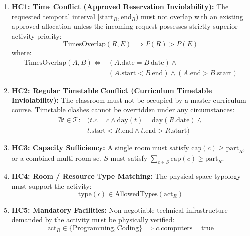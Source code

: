 \documentclass[conference]{IEEEtran}
\begin{document}
\begin{enumerate}
    \item \textbf{HC1: Time Conflict (Approved Reservation Inviolability):} The requested temporal interval $[\text{start}_R, \text{end}_R)$ must not overlap with an existing approved allocation unless the incoming request possesses strictly superior activity priority:
    \begin{equation}
    \text{TimesOverlap}(R, E) \implies P(R) > P(E)
    \end{equation}
    where:
    \begin{equation}
    \begin{aligned}
    \text{TimesOverlap}(A, B) \iff & (A.\text{date} = B.\text{date}) \land \\
    & (A.\text{start} < B.\text{end}) \land (A.\text{end} > B.\text{start})
    \end{aligned}
    \end{equation}
    \item \textbf{HC2: Regular Timetable Conflict (Curriculum Timetable Inviolability):} The classroom must not be occupied by a master curriculum course. Timetable clashes cannot be overridden under any circumstances:
    \begin{equation}
    \begin{aligned}
    \nexists t \in \mathcal{T} : & (t.c = c \land \text{day}(t) = \text{day}(R.\text{date}) \land \\
    & t.\text{start} < R.\text{end} \land t.\text{end} > R.\text{start})
    \end{aligned}
    \end{equation}
    \item \textbf{HC3: Capacity Sufficiency:} A single room must satisfy $\text{cap}(c) \ge \text{part}_R$, or a combined multi-room set $S$ must satisfy $\sum_{c \in S} \text{cap}(c) \ge \text{part}_R$.
    \item \textbf{HC4: Room / Resource Type Matching:} The physical space typology must support the activity:
    \begin{equation}
    \text{type}(c) \in \text{AllowedTypes}(\text{act}_R)
    \end{equation}
    \item \textbf{HC5: Mandatory Facilities:} Non-negotiable technical infrastructure demanded by the activity must be physically verified:
    \begin{equation}
    \text{act}_R \in \{\text{Programming}, \text{Coding}\} \implies c.\text{computers} = \text{true}

\end{equation}
\end{enumerate}
\end{document}
